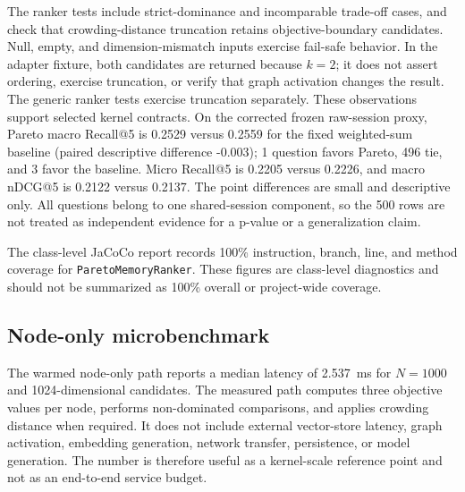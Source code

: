 \documentclass[review,12pt]{elsarticle}
\begin{document}
The ranker tests include strict-dominance and incomparable trade-off cases, and check that crowding-distance truncation retains objective-boundary candidates. Null, empty, and dimension-mismatch inputs exercise fail-safe behavior. In the adapter fixture, both candidates are returned because $k=2$; it does not assert ordering, exercise truncation, or verify that graph activation changes the result. The generic ranker tests exercise truncation separately. These observations support selected kernel contracts. On the corrected frozen raw-session proxy, Pareto macro Recall@5 is 0.2529 versus 0.2559 for the fixed weighted-sum baseline (paired descriptive difference -0.003); 1 question favors Pareto, 496 tie, and 3 favor the baseline. Micro Recall@5 is 0.2205 versus 0.2226, and macro nDCG@5 is 0.2122 versus 0.2137. The point differences are small and descriptive only. All questions belong to one shared-session component, so the 500 rows are not treated as independent evidence for a p-value or a generalization claim.

The class-level JaCoCo report records 100\% instruction, branch, line, and method coverage for \texttt{ParetoMemoryRanker}. These figures are class-level diagnostics and should not be summarized as 100\% overall or project-wide coverage.

\subsection{Node-only microbenchmark}

The warmed node-only path reports a median latency of 2.537~ms for $N=1000$ and 1024-dimensional candidates. The measured path computes three objective values per node, performs non-dominated comparisons, and applies crowding distance when required. It does not include external vector-store latency, graph activation, embedding generation, network transfer, persistence, or model generation. The number is therefore useful as a kernel-scale reference point and not as an end-to-end service budget.
\end{document}
